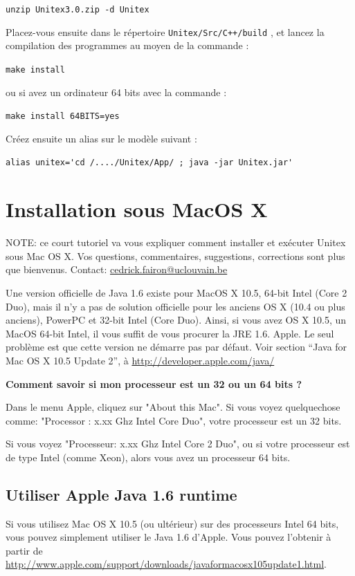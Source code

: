 \bigskip \noindent \verb$unzip Unitex3.0.zip -d Unitex$

\bigskip
\noindent Placez-vous ensuite dans le répertoire \verb|Unitex/Src/C++/build|                                     , et lancez la compilation des
programmes au moyen de la commande :


\bigskip \verb+make install+

\bigskip
\noindent ou si avez un ordinateur 64 bits avec la commande :
 
\bigskip \verb+make install 64BITS=yes+

\bigskip
\noindent Créez ensuite un alias sur le modèle suivant :

\bigskip \verb$alias unitex='cd /..../Unitex/App/ ; java -jar Unitex.jar'$


\section{Installation sous MacOS X}
\label{section-macos-install}
\noindent NOTE: ce court tutoriel va vous expliquer comment installer et exécuter Unitex sous Mac OS
X. Vos questions, commentaires, suggestions,
corrections sont plus que bienvenus.
\noindent Contact: \url{cedrick.fairon@uclouvain.be}

\bigskip
\noindent Une version officielle de Java 1.6 existe pour MacOS X 10.5, 64-bit Intel 
(Core 2 Duo), mais il n'y a pas de solution officielle pour les anciens OS X (10.4 ou plus anciens),
PowerPC et 32-bit Intel (Core Duo). Ainsi,
 si vous avez OS X 10.5, un MacOS 64-bit Intel, il vous suffit de vous procurer
	la JRE 1.6. Apple. Le seul problème est que cette version ne démarre pas par défaut.
	Voir section ``Java for Mac OS X 10.5 Update 2'', à \url{http://developer.apple.com/java/}


\noindent\textbf{Comment savoir si mon processeur est un 32 ou un 64 bits ?}

\noindent Dans le menu Apple, cliquez sur "About this Mac". Si vous voyez quelquechose comme:
"Processor : x.xx Ghz Intel Core Duo", votre processeur est un 32 bits.

\bigskip
\noindent Si vous voyez "Processeur: x.xx Ghz Intel Core 2 Duo", ou si votre
processeur est de type Intel (comme Xeon), alors vous avez un processeur 64 bits.

\subsection{Utiliser Apple Java 1.6 runtime}
\bigskip{}
\noindent Si vous utilisez Mac OS X 10.5 (ou ultérieur) sur des processeurs Intel 64 bits, vous pouvez simplement utiliser le Java 1.6 d'Apple. Vous pouvez l'obtenir à partir de \url{http://www.apple.com/support/downloads/javaformacosx105update1.html}.

